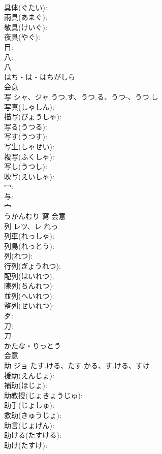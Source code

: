 \documentclass[8pt]{extreport}
\begin{document}
\begin{CJK}{UTF8}{min}
\\	具体(ぐたい): 
\\	雨具(あまぐ): 
\\	敬具(けいぐ): 
\\	夜具(やぐ): 
\\	目: 
\\	八: 
\\	八	
\\	はち・は・はちがしら	
\\	会意 
\\	写	シャ、ジャ	うつ.す、うつ.る、うつ-、うつ.し		
\\	写真(しゃしん): 
\\	描写(びょうしゃ): 
\\	写る(うつる): 
\\	写す(うつす): 
\\	写生(しゃせい): 
\\	複写(ふくしゃ): 
\\	写し(うつし): 
\\	映写(えいしゃ): 
\\	冖: 
\\	与: 
\\	宀	
\\	うかんむり	寫	会意 
\\	列	レツ、レ		れっ	
\\	列車(れっしゃ): 
\\	列島(れっとう): 
\\	列(れつ): 
\\	行列(ぎょうれつ): 
\\	配列(はいれつ): 
\\	陳列(ちんれつ): 
\\	並列(へいれつ): 
\\	整列(せいれつ): 
\\	歹: 
\\	刀: 
\\	刀	
\\	かたな・りっとう	
\\	会意 
\\	助	ジョ	たす.ける、たす.かる、す.ける、すけ		
\\	援助(えんじょ): 
\\	補助(ほじょ): 
\\	助教授(じょきょうじゅ): 
\\	助手(じょしゅ): 
\\	救助(きゅうじょ): 
\\	助言(じょげん): 
\\	助ける(たすける): 
\\	助け(たすけ): 

\end{CJK}
\end{document}
